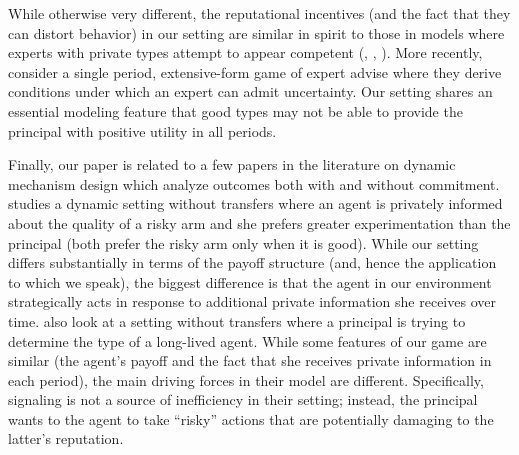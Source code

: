 \documentclass[11pt,reqno]{amsart}
\begin{document}
While otherwise very different, the reputational incentives (and the fact that they can distort behavior) in our setting are similar in spirit to those in models where experts with private types attempt to appear competent (\cite{prendergast1996}, \cite{morris2001}, \cite{ottaviani2006reputational}). More recently, \citet{backus2018} consider a single period, extensive-form game of expert advise where they derive conditions under which an expert can admit uncertainty. Our setting shares an essential modeling feature that good types may not be able to provide the principal with positive utility in all periods.

Finally, our paper is related to a few papers in the literature on dynamic mechanism design which analyze outcomes both with and without commitment. \cite{guo2016} studies a dynamic setting without transfers where an agent is privately informed about the quality of a risky arm and she prefers greater experimentation than the principal (both prefer the risky arm only when it is good). While our setting differs substantially in terms of the payoff structure (and, hence the application to which we speak), the biggest difference is that the agent in our environment strategically acts in response to additional private information she receives over time. \cite{aghion2016} also look at a setting without transfers where a principal is trying to determine the type of a long-lived agent. While some features of our game are similar (the agent's payoff and the fact that she receives private information in each period), the main driving forces in their model are different. Specifically, signaling is not a source  of inefficiency in their setting; instead, the principal wants to the agent to take ``risky'' actions that are potentially damaging to the latter's reputation.

\newpage



\end{document}

